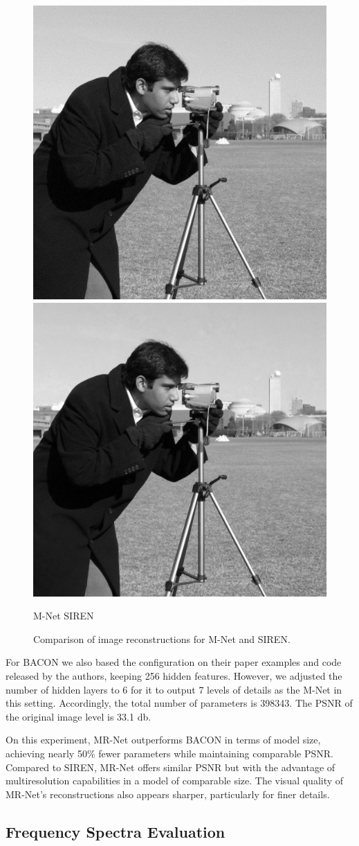 \begin{figure}[!h]
\centering
\includegraphics[width=0.44\linewidth]{img/ch5/rec-MR-Net.png}
\includegraphics[width=0.44\linewidth]{img/ch5/rec-SIREN.png} \\
\centerline{M-Net \hfil SIREN}
\caption{Comparison of image reconstructions for M-Net and SIREN.}
\label{f:siren}
\end{figure}


For BACON we also based the configuration on their paper examples and code released by the authors, keeping 256 hidden features. However, we adjusted the number of hidden layers to 6 for it to output 7 levels of details as the M-Net in this setting. Accordingly, the total number of parameters is 398343. The PSNR of the original image level is 33.1 db.

On this experiment, MR-Net outperforms BACON in terms of model size, achieving nearly 50\% fewer parameters while maintaining comparable PSNR. Compared to SIREN, MR-Net offers similar PSNR but with the advantage of multiresolution capabilities in a model of comparable size. The visual quality of MR-Net’s reconstructions also appears sharper, particularly for finer details.

\subsection{Frequency Spectra Evaluation}
\label{sub:spectra-eval}

